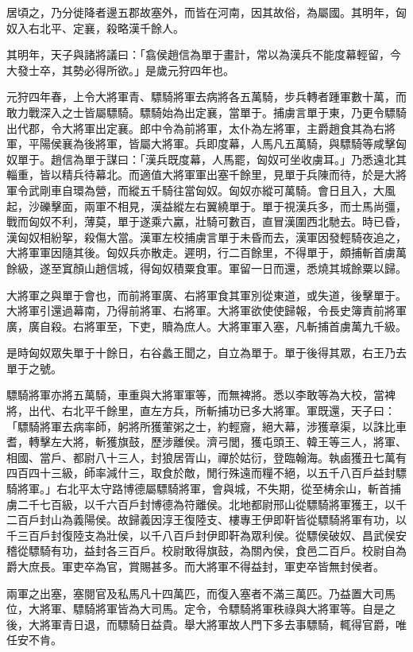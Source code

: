\begin{pinyinscope}
居頃之，乃分徙降者邊五郡故塞外，而皆在河南，因其故俗，為屬國。其明年，匈奴入右北平、定襄，殺略漢千餘人。

其明年，天子與諸將議曰：「翕侯趙信為單于畫計，常以為漢兵不能度幕輕留，今大發士卒，其勢必得所欲。」是歲元狩四年也。

元狩四年春，上令大將軍青、驃騎將軍去病將各五萬騎，步兵轉者踵軍數十萬，而敢力戰深入之士皆屬驃騎。驃騎始為出定襄，當單于。捕虜言單于東，乃更令驃騎出代郡，令大將軍出定襄。郎中令為前將軍，太仆為左將軍，主爵趙食其為右將軍，平陽侯襄為後將軍，皆屬大將軍。兵即度幕，人馬凡五萬騎，與驃騎等咸擊匈奴單于。趙信為單于謀曰：「漢兵既度幕，人馬罷，匈奴可坐收虜耳。」乃悉遠北其輜重，皆以精兵待幕北。而適值大將軍軍出塞千餘里，見單于兵陳而待，於是大將軍令武剛車自環為營，而縱五千騎往當匈奴。匈奴亦縱可萬騎。會日且入，大風起，沙礫擊面，兩軍不相見，漢益縱左右翼繞單于。單于視漢兵多，而士馬尚彊，戰而匈奴不利，薄莫，單于遂乘六驘，壯騎可數百，直冒漢圍西北馳去。時已昏，漢匈奴相紛挐，殺傷大當。漢軍左校捕虜言單于未昏而去，漢軍因發輕騎夜追之，大將軍軍因隨其後。匈奴兵亦散走。遲明，行二百餘里，不得單于，頗捕斬首虜萬餘級，遂至窴顏山趙信城，得匈奴積粟食軍。軍留一日而還，悉燒其城餘粟以歸。

大將軍之與單于會也，而前將軍廣、右將軍食其軍別從東道，或失道，後擊單于。大將軍引還過幕南，乃得前將軍、右將軍。大將軍欲使使歸報，令長史簿責前將軍廣，廣自殺。右將軍至，下吏，贖為庶人。大將軍軍入塞，凡斬捕首虜萬九千級。

是時匈奴眾失單于十餘日，右谷蠡王聞之，自立為單于。單于後得其眾，右王乃去單于之號。

驃騎將軍亦將五萬騎，車重與大將軍軍等，而無裨將。悉以李敢等為大校，當裨將，出代、右北平千餘里，直左方兵，所斬捕功已多大將軍。軍既還，天子曰：「驃騎將軍去病率師，躬將所獲葷粥之士，約輕齎，絕大幕，涉獲章渠，以誅比車耆，轉擊左大將，斬獲旗鼓，歷涉離侯。濟弓閭，獲屯頭王、韓王等三人，將軍、相國、當戶、都尉八十三人，封狼居胥山，禪於姑衍，登臨翰海。執鹵獲丑七萬有四百四十三級，師率減什三，取食於敵，閒行殊遠而糧不絕，以五千八百戶益封驃騎將軍。」右北平太守路博德屬驃騎將軍，會與城，不失期，從至梼余山，斬首捕虜二千七百級，以千六百戶封博德為符離侯。北地都尉邢山從驃騎將軍獲王，以千二百戶封山為義陽侯。故歸義因淳王復陸支、樓專王伊即靬皆從驃騎將軍有功，以千三百戶封復陸支為壯侯，以千八百戶封伊即靬為眾利侯。從驃侯破奴、昌武侯安稽從驃騎有功，益封各三百戶。校尉敢得旗鼓，為關內侯，食邑二百戶。校尉自為爵大庶長。軍吏卒為官，賞賜甚多。而大將軍不得益封，軍吏卒皆無封侯者。

兩軍之出塞，塞閱官及私馬凡十四萬匹，而復入塞者不滿三萬匹。乃益置大司馬位，大將軍、驃騎將軍皆為大司馬。定令，令驃騎將軍秩祿與大將軍等。自是之後，大將軍青日退，而驃騎日益貴。舉大將軍故人門下多去事驃騎，輒得官爵，唯任安不肯。


\end{pinyinscope}
